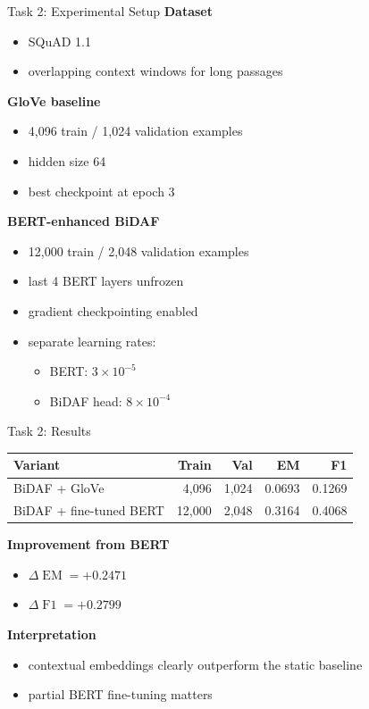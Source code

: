 \documentclass{beamer}
\newcommand{\EM}{\operatorname{EM}}
\newcommand{\Fone}{\operatorname{F1}}
\begin{document}
\begin{frame}{Task 2: Experimental Setup}
\small
\textbf{Dataset}
\begin{itemize}
  \item SQuAD 1.1
  \item overlapping context windows for long passages
\end{itemize}

\vspace{0.3em}
\textbf{GloVe baseline}
\begin{itemize}
  \item 4,096 train / 1,024 validation examples
  \item hidden size 64
  \item best checkpoint at epoch 3
\end{itemize}

\vspace{0.3em}
\textbf{BERT-enhanced BiDAF}
\begin{itemize}
  \item 12,000 train / 2,048 validation examples
  \item last 4 BERT layers unfrozen
  \item gradient checkpointing enabled
  \item separate learning rates:
  \begin{itemize}
    \item BERT: \(3 \times 10^{-5}\)
    \item BiDAF head: \(8 \times 10^{-4}\)
  \end{itemize}
\end{itemize}
\end{frame}

\begin{frame}{Task 2: Results}
\small
\begin{table}
\centering
\begin{tabular}{lrrrr}
\toprule
Variant & Train & Val & EM & F1 \\
\midrule
BiDAF + GloVe & 4,096 & 1,024 & 0.0693 & 0.1269 \\
BiDAF + fine-tuned BERT & 12,000 & 2,048 & 0.3164 & 0.4068 \\
\bottomrule
\end{tabular}
\end{table}

\vspace{0.3em}
\textbf{Improvement from BERT}
\begin{itemize}
  \item $\Delta \EM = +0.2471$
  \item $\Delta \Fone = +0.2799$
\end{itemize}

\vspace{0.3em}
\textbf{Interpretation}
\begin{itemize}
  \item contextual embeddings clearly outperform the static baseline
  \item partial BERT fine-tuning matters
\end{itemize}
\end{frame}
\end{document}
